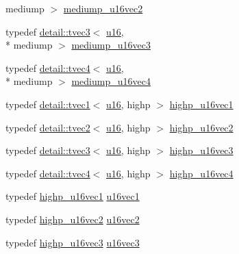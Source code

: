 \begin{DoxyCompactItemize}
mediump $>$ \hyperlink{group__gtc__type__precision_ga93fe5ddc21391f0334eb3a60b76c390b}{mediump\-\_\-u16vec2}
\item 
typedef \hyperlink{structglm_1_1detail_1_1tvec3}{detail\-::tvec3}$<$ \hyperlink{group__gtc__type__precision_gae7a1571503f83d2264ddfa705a6b082a}{u16}, \\*
mediump $>$ \hyperlink{group__gtc__type__precision_ga82dbfd263ced8d03577008a3ef096598}{mediump\-\_\-u16vec3}
\item 
typedef \hyperlink{structglm_1_1detail_1_1tvec4}{detail\-::tvec4}$<$ \hyperlink{group__gtc__type__precision_gae7a1571503f83d2264ddfa705a6b082a}{u16}, \\*
mediump $>$ \hyperlink{group__gtc__type__precision_gaad8b540f4231f69823c39fe9dfcb945a}{mediump\-\_\-u16vec4}
\item 
typedef \hyperlink{structglm_1_1detail_1_1tvec1}{detail\-::tvec1}$<$ \hyperlink{group__gtc__type__precision_gae7a1571503f83d2264ddfa705a6b082a}{u16}, highp $>$ \hyperlink{group__gtc__type__precision_gac4a83dec879b77ab0055c8da232da066}{highp\-\_\-u16vec1}
\item 
typedef \hyperlink{structglm_1_1detail_1_1tvec2}{detail\-::tvec2}$<$ \hyperlink{group__gtc__type__precision_gae7a1571503f83d2264ddfa705a6b082a}{u16}, highp $>$ \hyperlink{group__gtc__type__precision_gafad4245d389a4990eb505cd74a2d0a6f}{highp\-\_\-u16vec2}
\item 
typedef \hyperlink{structglm_1_1detail_1_1tvec3}{detail\-::tvec3}$<$ \hyperlink{group__gtc__type__precision_gae7a1571503f83d2264ddfa705a6b082a}{u16}, highp $>$ \hyperlink{group__gtc__type__precision_gad98b30ad9bbfb79233340be3ba53ceb6}{highp\-\_\-u16vec3}
\item 
typedef \hyperlink{structglm_1_1detail_1_1tvec4}{detail\-::tvec4}$<$ \hyperlink{group__gtc__type__precision_gae7a1571503f83d2264ddfa705a6b082a}{u16}, highp $>$ \hyperlink{group__gtc__type__precision_ga89074b108ec0643cffdfd008bedd3ffb}{highp\-\_\-u16vec4}
\item 
typedef \hyperlink{group__gtc__type__precision_gac4a83dec879b77ab0055c8da232da066}{highp\-\_\-u16vec1} \hyperlink{group__gtc__type__precision_ga95324b9d781c51a6d31b05fcc63c5cbe}{u16vec1}
\item 
typedef \hyperlink{group__gtc__type__precision_gafad4245d389a4990eb505cd74a2d0a6f}{highp\-\_\-u16vec2} \hyperlink{group__gtc__type__precision_ga4beac509930099bb494b4bd0a44c49f2}{u16vec2}
\item 
typedef \hyperlink{group__gtc__type__precision_gad98b30ad9bbfb79233340be3ba53ceb6}{highp\-\_\-u16vec3} \hyperlink{group__gtc__type__precision_ga372e1184da616b77fcbd48b8c166c24a}{u16vec3}

\end{DoxyCompactItemize}
